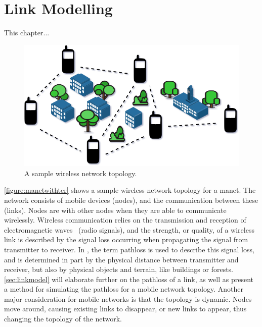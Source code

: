 \chapter{Link Modelling}\label{ch:linkmodel}
This chapter...\medbreak


\begin{figure}[ht]
    \centering
    \includegraphics[width=.7\textwidth]{figures/manet_with_terrain.png}
    \caption{A sample wireless network topology.}
    \label{figure:manetwithter}
\end{figure}

\autoref{figure:manetwithter} shows a sample wireless network topology for a \acrfull{manet}. The network consists of mobile devices (nodes), and the communication between these (links). Nodes are  with other nodes when they are able to communicate wirelessly. Wireless communication relies on the transmission and reception of electromagnetic waves~\cite[p.~10]{paper:linkmodel} (radio signals), and the strength, or quality, of a wireless link is described by the signal loss occurring when propagating the signal from transmitter to receiver. In \cite{paper:linkmodel}, the term \gls{pathloss} is used to describe this signal loss, and is determined in part by the physical distance between transmitter and receiver, but also by physical objects and terrain, like buildings or forests. \autoref{sec:linkmodel} will elaborate further on the \gls{pathloss} of a link, as well as present a method for simulating the \gls{pathloss} for a mobile network topology. Another major consideration for mobile networks is that the topology is dynamic. Nodes move around, causing existing links to disappear, or new links to appear, thus changing the topology of the network.

